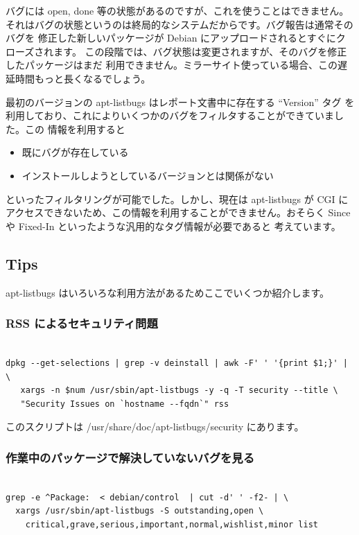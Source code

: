 \documentclass[mingoth,a4paper]{jsarticle}
\begin{document}
バグには open, done 等の状態があるのですが、これを使うことはできません。
それはバグの状態というのは終局的なシステムだからです。バグ報告は通常そのバグを
修正した新しいパッケージが Debian にアップロードされるとすぐにクローズされます。
この段階では、バグ状態は変更されますが、そのバグを修正したパッケージはまだ
利用できません。ミラーサイト使っている場合、この遅延時間もっと長くなるでしょう。

最初のバージョンの apt-listbugs はレポート文書中に存在する ``Version'' タグ
を利用しており、これによりいくつかのバグをフィルタすることができていました。この
情報を利用すると

\begin{itemize}
\item 既にバグが存在している
\item インストールしようとしているバージョンとは関係がない
\end{itemize}

といったフィルタリングが可能でした。しかし、現在は apt-listbugs が
CGI にアクセスできないため、この情報を利用することができません。おそらく
Since や Fixed-In といったような汎用的なタグ情報が必要であると
考えています。

\subsection{Tips}

apt-listbugs はいろいろな利用方法があるためここでいくつか紹介します。

\subsubsection{RSS によるセキュリティ問題}

\begin{verbatim}

dpkg --get-selections | grep -v deinstall | awk -F' ' '{print $1;}' | \
   xargs -n $num /usr/sbin/apt-listbugs -y -q -T security --title \
   "Security Issues on `hostname --fqdn`" rss
\end{verbatim}

このスクリプトは /usr/share/doc/apt-listbugs/security にあります。

\subsubsection{作業中のパッケージで解決していないバグを見る}

\begin{verbatim}

grep -e ^Package:  < debian/control  | cut -d' ' -f2- | \
  xargs /usr/sbin/apt-listbugs -S outstanding,open \
    critical,grave,serious,important,normal,wishlist,minor list
\end{verbatim}
\end{document}
